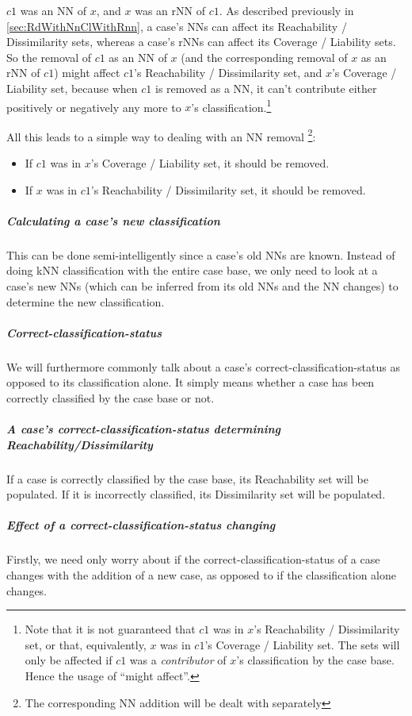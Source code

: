 \documentclass[a4paper,11pt]{report}
\begin{document}
$c1$ was an NN of $x$, and $x$ was an rNN of $c1$. As described previously in \ref{sec:RdWithNnClWithRnn}, a case's NNs can affect its Reachability / Dissimilarity sets, whereas a case's rNNs can affect its Coverage / Liability sets. So the removal of $c1$ as an NN of $x$ (and the corresponding removal of $x$ as an rNN of $c1$) might affect $c1$'s Reachability / Dissimilarity set, and $x$'s Coverage / Liability set, because when $c1$ is removed as a NN, it can't contribute either positively or negatively any more to $x$'s classification.\footnote{Note that it is not guaranteed that $c1$ was in $x$'s Reachability / Dissimilarity set, or that, equivalently, $x$ was in $c1$'s Coverage / Liability set. The sets will only be affected if $c1$ was a \emph{contributor} of $x$'s classification by the case base. Hence the usage of ``might affect''.}

All this leads to a simple way to dealing with an NN removal \footnote{The corresponding NN addition will be dealt with separately}:
\begin{itemize}
	\item If $c1$ was in $x$'s Coverage / Liability set, it should be removed.
	\item If $x$ was in $c1$'s Reachability / Dissimilarity set, it should be removed.
\end{itemize}

\subparagraph{Calculating a case's new classification}
This can be done semi-intelligently since a case's old NNs are known. Instead of doing kNN classification with the entire case base, we only need to look at a case's new NNs (which can be inferred from its old NNs and the NN changes) to determine the new classification.

\subparagraph{Correct-classification-status}
We will furthermore commonly talk about a case's correct-classification-status as opposed to its classification alone. It simply means whether a case has been correctly classified by the case base or not. 

\subparagraph{A case's correct-classification-status determining Reachability/Dissimilarity}
If a case is correctly classified by the case base, its Reachability set will be populated. If it is incorrectly classified, its Dissimilarity set will be populated.
 
\subparagraph{Effect of a correct-classification-status changing}
Firstly, we need only worry about if the correct-classification-status of a case changes with the addition of a new case, as opposed to if the classification alone changes.
\end{document}
